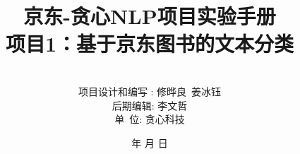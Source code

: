 \documentclass[a4paper]{article}
\begin{document}
\renewcommand{\contentsname}{目\ 录}
\renewcommand{\appendixname}{附录}
\renewcommand{\appendixpagename}{附录}
\renewcommand{\refname}{参考文献}
\renewcommand{\figurename}{图}
\renewcommand{\tablename}{表}
\renewcommand{\today}{\number\year 年 \number\month 月 \number\day 日}

\title{{\Huge 京东-贪心NLP项目实验手册{\large\linebreak\\}}{\Large 项目1：基于京东图书的文本分类\linebreak\linebreak}}
\author{\\项目设计和编写 : 修晔良\ 姜冰钰 \\
后期编辑: 李文哲\\
单\ 位: 贪心科技}
\date{\today}
\maketitle
\newpage



\begin{center}
\tableofcontents\label{c}
\end{center}
\newpage








\end{document}
